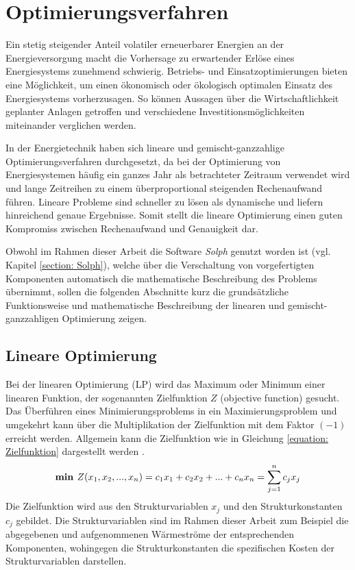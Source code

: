 \section{Optimierungsverfahren}\label{section: Optimierungsverfahren}
Ein stetig steigender Anteil volatiler erneuerbarer Energien an der Energieversorgung macht die Vorhersage zu erwartender Erlöse eines Energiesystems zunehmend schwierig. Betriebs- und Einsatzoptimierungen bieten eine Möglichkeit, um einen ökonomisch oder ökologisch optimalen Einsatz des Energiesystems vorherzusagen. So können Aussagen über die Wirtschaftlichkeit geplanter Anlagen getroffen und verschiedene Investitionsmöglichkeiten miteinander verglichen werden. 

In der Energietechnik haben sich lineare und gemischt-ganzzahlige Optimierungsverfahren durchgesetzt, da bei der Optimierung von Energiesystemen häufig ein ganzes Jahr als betrachteter Zeitraum verwendet wird und lange Zeitreihen zu einem überproportional steigenden Rechenaufwand führen. Lineare Probleme sind schneller zu lösen als dynamische und liefern hinreichend genaue Ergebnisse. Somit stellt die lineare Optimierung einen guten Kompromiss zwischen Rechenaufwand und Genauigkeit dar. \cite{GABRIELLI2018408}

Obwohl im Rahmen dieser Arbeit die Software \textit{Solph} genutzt worden ist (vgl. Kapitel \ref{section: Solph}), welche über die Verschaltung von vorgefertigten Komponenten automatisch die mathematische Beschreibung des Problems übernimmt, sollen die folgenden Abschnitte kurz die grundsätzliche Funktionsweise und mathematische Beschreibung der linearen und gemischt-ganzzahligen Optimierung zeigen.  

\subsection{Lineare Optimierung}
Bei der linearen Optimierung (\ac{LP}) wird das Maximum oder Minimum einer linearen Funktion, der sogenannten Zielfunktion $Z$ (objective function) gesucht. Das Überführen eines Minimierungsproblems in ein Maximierungsproblem und umgekehrt kann über die Multiplikation der Zielfunktion mit dem Faktor $(-1)$ erreicht werden. Allgemein kann die Zielfunktion wie in Gleichung \ref{equation: Zielfunktion} dargestellt werden \cite{Stoecker2008}.
	\begin{equation}\label{equation: Zielfunktion}
		\text{\textbf{min }}  Z(x_1, x_2, ..., x_n) = c_1x_1 + c_2x_2 + ... + c_nx_n = \sum_{j=1}^{n}c_jx_j
	\end{equation}
Die Zielfunktion wird aus den Strukturvariablen $x_j$ und den Strukturkonstanten $c_j$ gebildet. Die Strukturvariablen sind im Rahmen dieser Arbeit zum Beispiel die abgegebenen und aufgenommenen Wärmeströme der entsprechenden Komponenten, wohingegen die Strukturkonstanten die spezifischen Kosten der Strukturvariablen darstellen.

